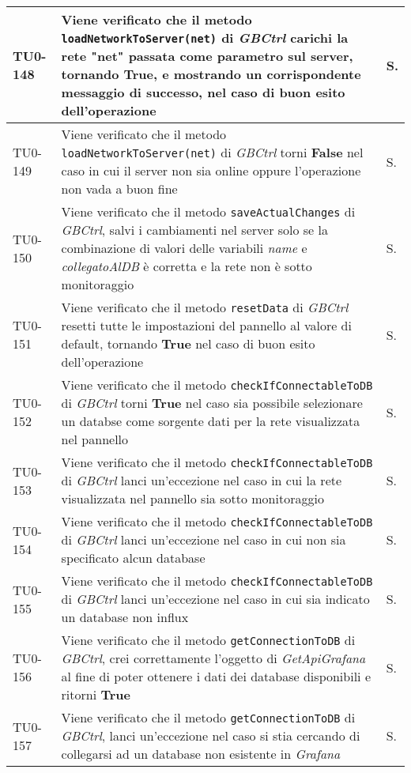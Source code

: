 \begin{longtable}{|C{.15\textwidth}|m{.66\textwidth}|C{.10\textwidth}|}
\hline
TU0-148 & Viene verificato che il metodo \texttt{loadNetworkToServer(net)} di \textit{GBCtrl} carichi la rete "net" passata come parametro sul server, tornando \textbf{True}, e mostrando un corrispondente messaggio di successo, nel caso di buon esito dell'operazione & S.\\
\hline
{}TU0-149 & Viene verificato che il metodo \texttt{loadNetworkToServer(net)} di \textit{GBCtrl} torni \textbf{False} nel caso in cui il server non sia online oppure l'operazione non vada a buon fine & S.\\
\hline
TU0-150 & Viene verificato che il metodo \texttt{saveActualChanges} di \textit{GBCtrl}, salvi i cambiamenti nel server solo se la combinazione di valori delle variabili \textit{name} e \textit{collegatoAlDB} è corretta e la rete non è sotto monitoraggio & S.\\
\hline
{}TU0-151 & Viene verificato che il metodo \texttt{resetData} di \textit{GBCtrl} resetti tutte le impostazioni del pannello al valore di default, tornando \textbf{True} nel caso di buon esito dell'operazione & S.\\
\hline
TU0-152 & Viene verificato che il metodo \texttt{checkIfConnectableToDB} di \textit{GBCtrl} torni \textbf{True} nel caso sia possibile selezionare un databse come sorgente dati per la rete visualizzata nel pannello & S.\\
\hline
{}TU0-153 & Viene verificato che il metodo \texttt{checkIfConnectableToDB} di \textit{GBCtrl} lanci un'eccezione nel caso in cui la rete visualizzata nel pannello sia sotto monitoraggio & S.\\
\hline
TU0-154 & Viene verificato che il metodo \texttt{checkIfConnectableToDB} di \textit{GBCtrl} lanci un'eccezione nel caso in cui non sia specificato alcun database & S.\\
\hline
{}TU0-155 & Viene verificato che il metodo \texttt{checkIfConnectableToDB} di \textit{GBCtrl} lanci un'eccezione nel caso in cui sia indicato un database non influx & S.\\
\hline
TU0-156 & Viene verificato che il metodo \texttt{getConnectionToDB} di \textit{GBCtrl}, crei correttamente l'oggetto di \textit{GetApiGrafana} al fine di poter ottenere i dati dei database disponibili e ritorni \textbf{True} & S.\\
\hline
{}TU0-157 & Viene verificato che il metodo \texttt{getConnectionToDB} di \textit{GBCtrl}, lanci un'eccezione nel caso si stia cercando di collegarsi ad un database non esistente in \textit{Grafana} & S.\\

\end{longtable}
